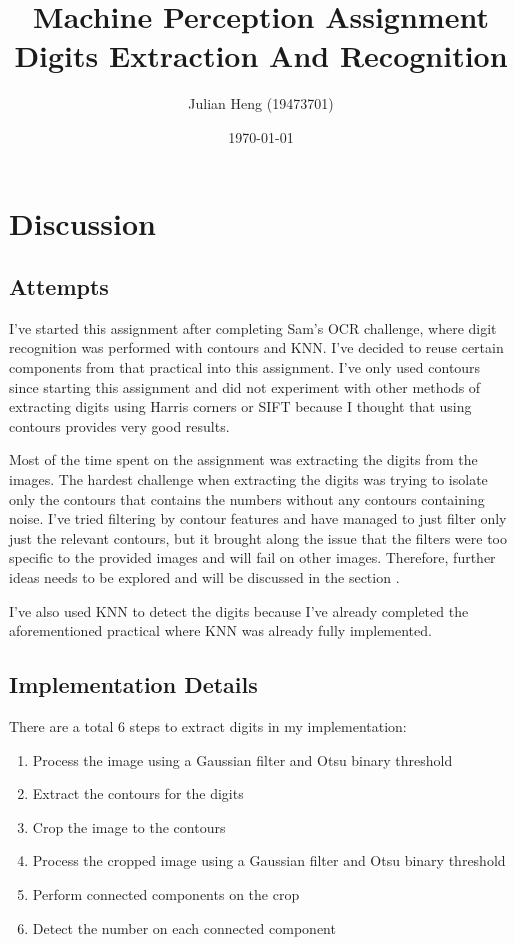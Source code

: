 \documentclass[a4paper, 12pt, titlepage]{article}
\title{\huge \textbf{Machine Perception Assignment
Digits Extraction And Recognition}}
\author{Julian Heng (19473701)}
\date{\today}
\begin{document}
\maketitle
\tableofcontents
\newpage

\pagestyle{fancy}

\fancyhf[FC]{\thepage}

\section{Discussion}
\subsection{Attempts}
I've started this assignment after completing Sam's OCR challenge, where digit
recognition was performed with contours and KNN. I've decided to reuse certain
components from that practical into this assignment. I've only used contours
since starting this assignment and did not experiment with other methods of
extracting digits using Harris corners or SIFT because I thought that using
contours provides very good results.

Most of the time spent on the assignment was extracting the digits from the
images. The hardest challenge when extracting the digits was trying to isolate
only the contours that contains the numbers without any contours containing
noise. I've tried filtering by contour features and have managed to just filter
only just the relevant contours, but it brought along the issue that the
filters were too specific to the provided images and will fail on other images.
Therefore, further ideas needs to be explored and will be discussed in the
section .

I've also used KNN to detect the digits because I've already completed the
aforementioned practical where KNN was already fully implemented.


\subsection{Implementation Details}
\label{impl}

There are a total 6 steps to extract digits in my implementation:
\begin{enumerate}
    \item Process the image using a Gaussian filter and Otsu binary
        threshold
    \item Extract the contours for the digits
    \item Crop the image to the contours
    \item Process the cropped image using a Gaussian filter and Otsu binary
        threshold
    \item Perform connected components on the crop
    \item Detect the number on each connected component
\end{enumerate}
\end{document}
